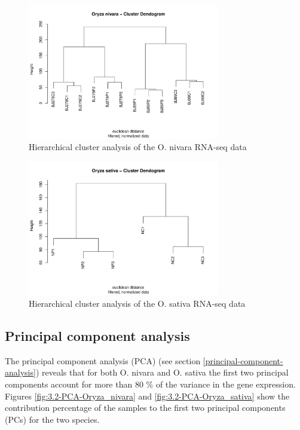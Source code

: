 \begin{figure}[htbp]
    \caption{Hierarchical cluster analysis of the O. nivara RNA-seq data}
    \label{fig:3.1-Clust-Dendrogram-Oryza_nivara}
    \includegraphics[width=0.75\textwidth]{../../results/plots-and-tables/3.1-Clust-Dendrogram-Oryza_nivara}
\end{figure}

\begin{figure}[htbp]
    \caption{Hierarchical cluster analysis of the O. sativa RNA-seq data}
    \label{fig:3.1-Clust-Dendrogram-Oryza_sativa}
    \includegraphics[width=0.75\textwidth]{../../results/plots-and-tables/3.1-Clust-Dendrogram-Oryza_sativa}
\end{figure}


\subsection{Principal component analysis}

The principal component analysis (PCA) (see section \ref{principal-component-analysis}) reveals that for both O. nivara and O. sativa the first two principal components account for more than 80 \% of the variance in the gene expression. Figures  \ref{fig:3.2-PCA-Oryza_nivara} and \ref{fig:3.2-PCA-Oryza_sativa} show the contribution percentage of the samples to the first two principal components (PCs) for the two species.

